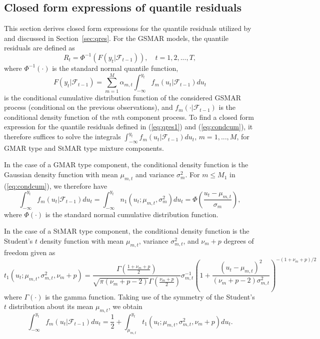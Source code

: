 \documentclass[nojss]{jss} %
\begin{document}
\begin{appendix}
\section{Closed form expressions of quantile residuals}\label{sec:qresexpr}
This section derives closed form expressions for the quantile residuals utilized by  and discussed in Section~\ref{sec:qres}. For the GSMAR models, the quantile residuals are defined as
%
\begin{equation}\label{eq:qres1}
R_t=\Phi^{-1}(F(y_t|\mathcal{F}_{t-1})), \quad t=1,2,...,T,
\end{equation}
%
where $\Phi^{-1}(\cdot)$ is the standard normal quantile function,
%
\begin{equation}\label{eq:condcum}
F(y_t|\mathcal{F}_{t-1})= \sum_{m=1}^M\alpha_{m,t}\int_{-\infty}^{y_t} f_m(u_t|\mathcal{F}_{t-1})du_t
\end{equation}
%
is the conditional cumulative distribution function of the considered GSMAR process (conditional on the previous observations),
and $f_m(\cdot|\mathcal{F}_{t-1})$ is the conditional density function of the $m$th component process. To find a closed form expression for the quantile residuals defined in (\ref{eq:qres1}) and (\ref{eq:condcum}), it therefore suffices to solve the integrals $\int_{-\infty}^{y_t} f_m(u_t|\mathcal{F}_{t-1})du_t$, $m=1,...,M$, for GMAR type and StMAR type mixture components.
%

In the case of a GMAR type component, the conditional density function is the Gaussian density function with mean $\mu_{m,t}$ and variance $\sigma_m^2$. For $m\leq M_1$ in (\ref{eq:condcum}), we therefore have
%
\begin{equation}
\int_{-\infty}^{y_t} f_m(u_t|\mathcal{F}_{t-1})du_t = \int_{-\infty}^{y_t}n_1(u_t;\mu_{m,t},\sigma_m^2) du_t= \Phi\left(\frac{u_t - \mu_{m,t}}{\sigma_m}\right),
\end{equation}
%
where $\Phi (\cdot)$ is the standard normal cumulative distribution function.

In the case of a StMAR type component, the conditional density function is the Student's $t$ density function with mean $\mu_{m,t}$, variance $\sigma_{m,t}^2$, and $\nu_m + p$ degrees of freedom given as \cite[Appendix A]{Meitz+Preve+Saikkonen:2021}
%
\begin{equation}
t_1(u_t;\mu_{m,t},\sigma_{m,t}^2,\nu_m+p) = \frac{\Gamma\left(\frac{1 + \nu_m + p}{2}\right)}{\sqrt{\pi(\nu_m + p - 2)}\Gamma\left(\frac{\nu_m + p}{2}\right)}\sigma_{m,t}^{-1}\left(1 + \frac{(u_t - \mu_{m,t})^2}{(\nu_m + p - 2)\sigma_{m,t}^2} \right)^{-(1 + \nu_m + p)/2}
\end{equation}
%
where $\Gamma\left(\cdot\right)$ is the gamma function. Taking use of the symmetry of the Student's $t$ distribution about its mean $\mu_{m,t}$, we obtain
%
\begin{equation}\label{eq:int1}
\int_{-\infty}^{y_t} f_m(u_t|\mathcal{F}_{t-1})du_t = \frac{1}{2} + \int_{\mu_{m,t}}^{y_t}t_1(u_t;\mu_{m,t},\sigma_{m,t}^2,\nu_m+p) du_t.
\end{equation}
%


\end{appendix}
\end{document}
